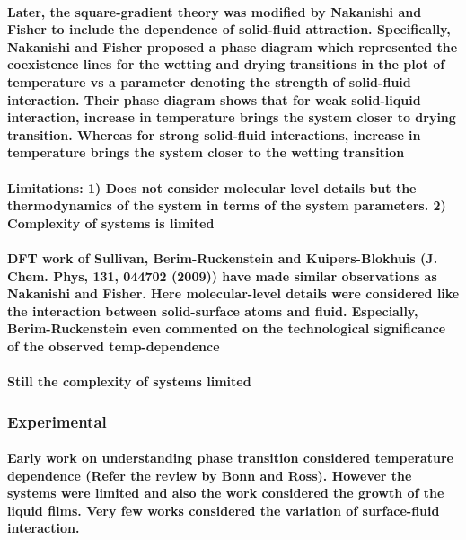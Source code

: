 \documentclass[a4paper,12pt,single,pdftex]{scrartcl}
\begin{document}
\label{ID_1622008046}\paragraph{Later, the square-gradient theory was modified by Nakanishi and Fisher to include the dependence of solid-fluid attraction. Specifically, Nakanishi and Fisher proposed a phase diagram which represented the coexistence lines for the wetting and drying transitions in the plot of temperature vs a parameter denoting the strength of solid-fluid interaction. Their phase diagram shows that for weak solid-liquid interaction, increase in temperature brings the system closer to drying transition. Whereas for strong solid-fluid interactions, increase in temperature brings the system closer to the wetting transition}

\label{ID_1656087306}\paragraph{Limitations: 1) Does not consider molecular level details but the thermodynamics of the system in terms of the system parameters. 2) Complexity of systems is limited}

\label{ID_1378614173}\paragraph{DFT work of Sullivan, Berim-Ruckenstein and Kuipers-Blokhuis (J. Chem. Phys, 131, 044702 (2009)) have made similar observations as Nakanishi and Fisher. Here molecular-level details were considered like the interaction between solid-surface atoms and fluid. Especially, Berim-Ruckenstein even commented on the technological significance of the observed temp-dependence}

\label{ID_678529580}\paragraph{Still  the complexity of systems limited}

\label{ID_869146050}\subsubsection{Experimental}

\label{ID_566286120}\paragraph{Early work on understanding phase transition considered temperature dependence (Refer the review by Bonn and Ross). However the systems were limited and also the work considered the growth of the liquid films.  Very few works considered the variation of surface-fluid interaction.}
\end{document}
